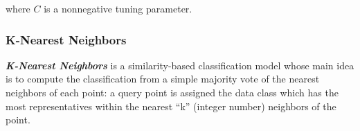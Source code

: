\documentclass[a4paper, 12pt]{book}
\begin{document}
where $C$ is a nonnegative tuning parameter.








\subsubsection{K-Nearest Neighbors}
\label{sssec:knn}

\textbf{\textit{K-Nearest Neighbors}} is a similarity-based classification model whose main idea is to compute the classification from a simple majority vote of the nearest neighbors of each point: a query point is assigned the data class which has the most representatives within the nearest ``k'' (integer number) neighbors of the point.
\end{document}
